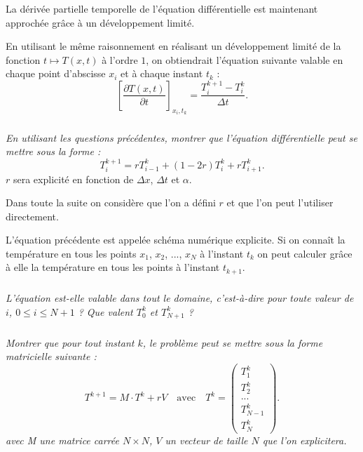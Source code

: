 \vspace{0.5cm}
La dérivée partielle temporelle de l'équation différentielle est maintenant approchée grâce à un
développement limité.

En utilisant le même raisonnement en réalisant un développement limité de la fonction 
$t\mapsto T(x,t)$ à l'ordre $1$, on obtiendrait l'équation suivante valable en chaque point
 d'abscisse $x_i$ et à chaque instant $t_k$ : 
$$
\left[\dfrac{\partial T(x,t)}{\partial t}\right]_{x_i,t_k} 
=
\dfrac{T_{i}^{k+1}- T_{i}^k}{\Delta t }.
$$



\subparagraph{}\textit{En utilisant les questions précédentes, montrer que 
l'équation différentielle peut se mettre sous la forme : 
$$
T_{i}^{k+1} = r T_{i-1}^{k} + \left( 1-2r \right) T_i^k + r T_{i+1}^k.
$$ 
}
$r$ sera explicité en fonction de $\Delta x$, $\Delta t$ et $\alpha$.

\vspace{.5cm}

Dans toute la suite on considère que l'on a défini $r$ et que l'on peut l'utiliser directement. 
\vspace{.5cm}

L'équation précédente est appelée schéma numérique explicite. Si on connaît la température en tous les points 
$x_1$, $x_2$, ..., $x_N$ à  l'instant $t_k$ on peut calculer grâce à elle la température en tous les points à l'instant 
$t_{k+1}$.

\subparagraph{}\textit{L'équation est-elle valable dans tout le domaine, c'est-à-dire pour toute valeur de $i$, $0\leq 
i\leq N+1$ ? Que valent $T_0^k$ et $T_{N+1}^k$ ?}

\subparagraph{}\textit{Montrer que pour tout instant $k$, le problème peut se mettre sous la forme matricielle suivante : }
$$
T^{k+1} = M \cdot T^k + rV \quad \text{avec} \quad T^k =
 \begin{pmatrix} T_1^k \\  T_2 ^k \\ ... \\  T_{N-1}^{k} \\ T_{N}^{k}  \end{pmatrix}.
$$
\textit{avec M une matrice carrée $N\times N$, $V$ un vecteur de taille $N$ que l'on explicitera.}




